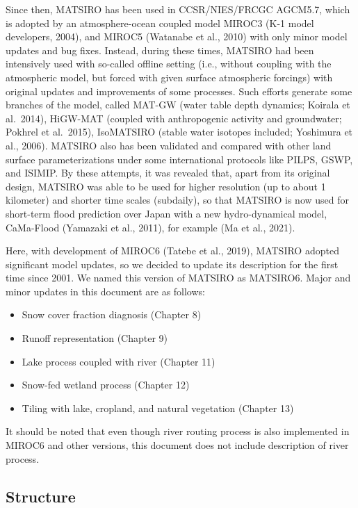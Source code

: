 Since then, MATSIRO has been used in CCSR/NIES/FRCGC AGCM5.7, which is adopted by an atmosphere-ocean coupled model MIROC3 (K-1 model developers, 2004), and MIROC5 (Watanabe et al., 2010) with only
minor model updates and bug fixes. Instead, during these times, MATSIRO had been intensively used with so-called offline setting (i.e., without coupling with the atmospheric model, but forced with
given surface atmospheric forcings) with original updates and improvements of some processes. Such efforts generate some branches of the model, called MAT-GW (water table depth dynamics; Koirala et
al.~2014), HiGW-MAT (coupled with anthropogenic activity and groundwater; Pokhrel et al.~2015), IsoMATSIRO (stable water isotopes included; Yoshimura et al., 2006). MATSIRO also has been validated and
compared with other land surface parameterizations under some international protocols like PILPS, GSWP, and ISIMIP. By these attempts, it was revealed that, apart from its original design, MATSIRO was
able to be used for higher resolution (up to about 1 kilometer) and shorter time scales (subdaily), so that MATSIRO is now used for short-term flood prediction over Japan with a new hydro-dynamical
model, CaMa-Flood (Yamazaki et al., 2011), for example (Ma et al., 2021).

Here, with development of MIROC6 (Tatebe et al., 2019), MATSIRO adopted significant model updates, so we decided to update its description for the first time since 2001. We named this version of
MATSIRO as MATSIRO6. Major and minor updates in this document are as follows:

\begin{itemize}
\tightlist
\item
  Snow cover fraction diagnosis (Chapter 8)
\item
  Runoff representation (Chapter 9)
\item
  Lake process coupled with river (Chapter 11)
\item
  Snow-fed wetland process (Chapter 12)
\item
  Tiling with lake, cropland, and natural vegetation (Chapter 13)
\end{itemize}

It should be noted that even though river routing process is also implemented in MIROC6 and other versions, this document does not include description of river process.

\hypertarget{structure}{%
\subsection{Structure}\label{structure}}

